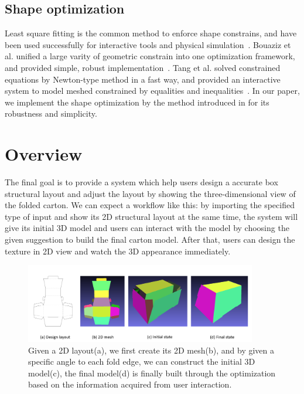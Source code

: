 \documentclass[submission]{gmp2018}
\begin{document}
\subsection{Shape optimization}
Least square fitting is the common method to enforce shape constrains, and have been used successfully for interactive tools and physical simulation~\cite{Botsch:2006:PCP:1281957.1281959,Igarashi:2005:ASM:1186822.1073323}. Bouaziz et al.  unified a large varity of geometric constrain into one optimization framework, and provided simple, robust implementation~\cite{Bouaziz:2012:SSD:2346796.2346802}. Tang et al. solved constrained equations by Newton-type method in a fast way, and provided an interactive system to model meshed constrained by equalities and inequalities~\cite{Tang:2014:FPM:2601097.2601213}. In our paper, we implement the shape optimization by the method introduced in \cite{Bouaziz:2012:SSD:2346796.2346802} for its robustness and simplicity.


\section{Overview}\label{sec:overview}
The final goal is to provide a system which help users design a accurate box structural layout and adjust the layout by showing the three-dimensional view of the folded carton. We can expect a workflow like this: by importing the specified type of input and show its 2D structural layout at the same time, the system will give its initial 3D model and users can interact with the model by choosing the given suggestion to build the final carton model. After that, users can design the texture in 2D view and watch the 3D appearance immediately.

\begin{figure}
	\centering
	\includegraphics[width=0.9\textwidth]{images/overview.png}
	\caption{Given a 2D layout(a), we first create its 2D mesh(b), and by given a specific angle to each fold edge, we can construct the initial 3D model(c), the final model(d) is finally built through the optimization based on the information acquired from user interaction.}
	\label{fig:overview}
\end{figure} 
\end{document}

